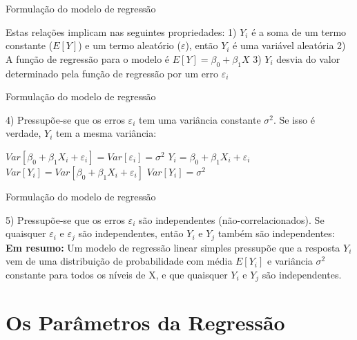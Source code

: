 \documentclass{beamer}\usepackage[]{graphicx}\usepackage[]{color}
\begin{document}
\begin{frame}{Formulação do modelo de regressão}

Estas relações implicam nas seguintes propriedades:
\vfill
1) $Y_i$ é a soma de um termo constante ($E[Y]$) e um termo aleatório ($\varepsilon$), então $Y_i$ é uma variável aleatória \pause
\vfill
2) A função de regressão para o modelo é $E[Y] = \beta _0 + \beta _1 X$ \pause
\vfill
3) $Y_i$ desvia do valor determinado pela função de regressão por um erro $\varepsilon _i$

\end{frame}


\begin{frame}{Formulação do modelo de regressão}

4) Pressupõe-se que os erros $\varepsilon _i$ tem uma variância constante $\sigma ^2$. Se isso é verdade, $Y_i$ tem a mesma variância:

\vfill
$Var[\beta _0 + \beta _1 X_i + \varepsilon _i] = Var[\varepsilon _i] = \sigma ^2$ \pause
\vfill
$Y_i = \beta _0 + \beta _1 X_i + \varepsilon _i$ \pause
\vfill
$Var[Y_i] = Var[\beta _0 + \beta _1 X_i + \varepsilon _i]$ \pause
\vfill
$Var[Y_i]= \sigma ^2$

\end{frame}

\begin{frame}{Formulação do modelo de regressão}

5) Pressupõe-se que os erros $\varepsilon_i$ são independentes (não-correlacionados). Se quaisquer $\varepsilon _i$ e $\varepsilon _j$ são independentes, então $Y_i$ e $Y_j$ também são independentes:
\vfill
\textbf{Em resumo:} Um modelo de regressão linear simples pressupõe que a resposta $Y_i$ vem de uma distribuição de probabilidade com média $E[Y_i]$ e variância $\sigma ^2$ constante para todos os níveis de X, e que quaisquer $Y_i$ e $Y_j$ são independentes. 

\end{frame}


\section{Os Parâmetros da Regressão}
\end{document}
